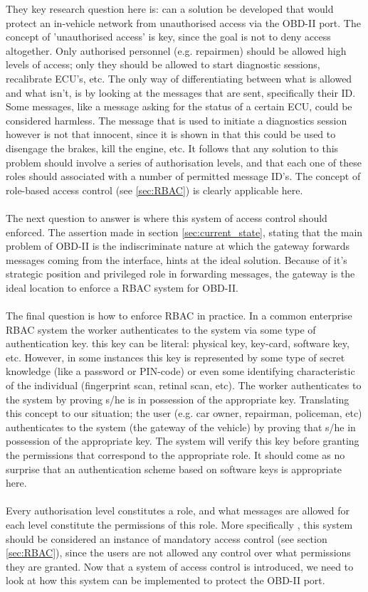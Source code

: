 They key research question here is: can a solution be developed that would protect an in-vehicle network from unauthorised access via the OBD-II port. The concept of 'unauthorised access' is key, since the goal is not to deny access altogether. Only authorised personnel (e.g. repairmen) should be allowed high levels of access; only they should be allowed to start diagnostic sessions, recalibrate ECU's, etc. The only way of differentiating between what is allowed and what isn't, is by looking at the messages that are sent, specifically their ID. Some messages, like a message asking for the status of a certain ECU, could be considered harmless. The message that is used to initiate a diagnostics session however is not that innocent, since it is shown in \cite{MillerC} that this could be used to disengage the brakes, kill the engine, etc. It follows that any solution to this problem should involve a series of authorisation levels, and that each one of these roles should associated with a number of permitted message ID's. The concept of role-based access control (see \ref{sec:RBAC}) is clearly applicable here. \\ \\ The next question to answer is where this system of access control should enforced. The assertion made in section \ref{sec:current_state}, stating that the main problem of OBD-II is the indiscriminate nature at which the gateway forwards messages coming from the interface, hints at the ideal solution. Because of it's strategic position and privileged role in forwarding messages, the gateway is the ideal location to enforce a RBAC system for OBD-II. \\ \\ The final question is how to enforce RBAC in practice. In a common enterprise RBAC system the worker authenticates to the system via some type of authentication key. this key can be literal: physical key, key-card, software key, etc. However, in some instances this key is represented by some type of secret knowledge (like a password or PIN-code) or even some identifying characteristic of the individual (fingerprint scan, retinal scan, etc). The  worker authenticates to the system by proving s/he is in possession of the appropriate key. Translating this concept to our situation; the user (e.g. car owner, repairman, policeman, etc) authenticates to the system (the gateway of the vehicle) by proving that s/he in possession of the appropriate key. The system will verify this key before granting the permissions that correspond to the appropriate role. It should come as no surprise that an authentication scheme based on software keys is appropriate here. \\ \\ Every authorisation level constitutes a role, and what messages are allowed for each level constitute the permissions of this role. More specifically , this system should be considered an instance of mandatory access control (see section \ref{sec:RBAC}), since the users are not allowed any control over what permissions they are granted. Now that a system of access control is introduced, we need to look at how this system can be implemented to protect the OBD-II port.

